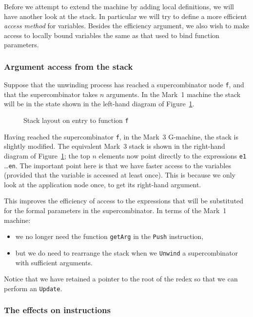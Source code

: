 Before we attempt to extend the machine by adding local definitions,
we will have another look at the stack. In particular we will try to
define a more efficient {\em access method\/} for variables. Besides the efficiency argument, we also
wish to make access to locally bound variables the same as that used
to bind function parameters.

\subsubsection{Argument access from the stack}

Suppose that the unwinding process has reached a supercombinator node
\mbox{\tt f}, and that the supercombinator takes $n$ arguments. In the Mark~1
machine the stack will be in the state shown in the left-hand diagram of
Figure~\ref{gm:X:arg}.
\begin{figure} %

\caption{Stack layout on entry to function \mbox{\tt f}}
\label{gm:X:arg}
\end{figure}

Having reached the supercombinator \mbox{\tt f}, in the Mark~3 G-machine, the
stack is slightly modified. The equivalent Mark~3 stack is shown in
the right-hand diagram of Figure~\ref{gm:X:arg}; the top $n$ elements
now point directly to the expressions {\tt e1} \ldots {\tt en}. The
important point here is that we have faster access to the
variables (provided that the variable is accessed at least
once). This is because we only look at the application node once, to
get its right-hand argument.

This improves the efficiency of access to the expressions that will be 
substituted for the formal parameters in the supercombinator. In terms
of the Mark~1 machine:
\begin{itemize}
\item we no longer need the function \mbox{\tt getArg} in the \mbox{\tt Push}
instruction,
\item but we do need to rearrange the stack when we \mbox{\tt Unwind} a
supercombinator with sufficient arguments.
\end{itemize}

Notice that we have retained a pointer to the root of the redex so
that we can perform an \mbox{\tt Update}.

\subsubsection{The effects on instructions}

